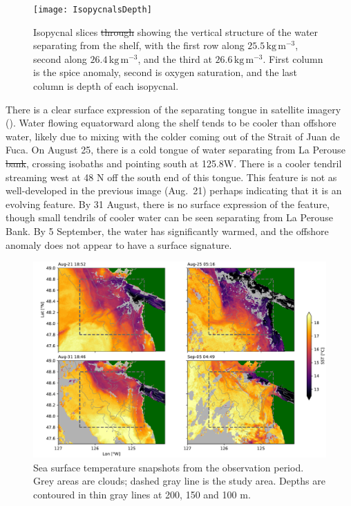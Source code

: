 \documentclass[draft]{agujournal2019}
\providecommand{\DIFadd}[1]{{\protect\color{blue}\uwave{#1}}} %
\providecommand{\DIFdel}[1]{{\protect\color{red}\sout{#1}}}                      %
\providecommand{\DIFaddbegin}{} %
\providecommand{\DIFaddend}{} %
\providecommand{\DIFdelbegin}{} %
\providecommand{\DIFdelend}{} %
\providecommand{\DIFaddFL}[1]{\DIFadd{#1}} %
\providecommand{\DIFdelFL}[1]{\DIFdel{#1}} %
\providecommand{\DIFaddbeginFL}{} %
\providecommand{\DIFaddendFL}{} %
\providecommand{\DIFdelbeginFL}{} %
\providecommand{\DIFdelendFL}{} %
\begin{document}
\begin{figure}[htbp]
  \begin{center}
    \texttt{[image: IsopycnalsDepth]}
    \caption{Isopycnal slices \DIFdelbeginFL \DIFdelFL{through }\DIFdelendFL \DIFaddbeginFL \DIFaddFL{of the MVP data }\DIFaddendFL showing the vertical structure of the water separating from the shelf, with the first row along $25.5 \,\mathrm{kg\,m^{-3}}$, second along $26.4\,\mathrm{kg\,m^{-3}}$, and the third at $26.6\,\mathrm{kg\,m^{-3}}$.  First column is the spice anomaly, second is oxygen saturation, and the last column is depth of each isopycnal.
      \label{fig:IsopycnalsDepth} }
  \end{center}
\end{figure}

There is a clear surface expression of the separating tongue in satellite imagery ().  Water flowing equatorward along the shelf tends to be cooler than offshore water, likely due to mixing with the colder coming out of the Strait of Juan de Fuca. On August 25, there is a cold tongue of water separating from La Perouse \DIFdelbegin \DIFdel{bank}\DIFdelend \DIFaddbegin \DIFadd{Bank}\DIFaddend , crossing isobaths and pointing south at 125.8\textdegree W.   There is a cooler tendril streaming west at 48 N off the south end of this tongue.  This feature is not as well-developed in the previous image (Aug.\ 21) perhaps indicating that it is an evolving feature.  By 31 August, there is no surface expression of the feature, though small tendrils of cooler water can be seen separating from La Perouse Bank.  By 5 September, the water has significantly warmed, and the offshore anomaly does not appear to have a surface signature.

\begin{figure}
  \begin{center}
    \includegraphics[width=6in]{SSTSnaps}
    \caption{Sea surface temperature snapshots from the observation period.  Grey areas are clouds; dashed gray line is the study area. Depths are contoured in thin gray lines at 200, 150 and 100 m. \cite{L2PMetopA}\label{fig:SST}}
  \end{center}
\end{figure}
\end{document}
